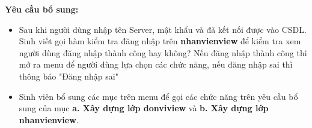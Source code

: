  \textbf{ Yêu cầu bổ sung:}
 \begin{itemize}
 	\item Sau khi người dùng nhập tên Server, mật khẩu và đã kết nối được vào  CSDL. Sinh viết gọi hàm kiểm tra đăng nhập trên \textbf{nhanvienview}  để kiểm tra xem người dùng đăng nhập thành công hay không? Nếu đăng nhập thành công thì mở ra menu để người dùng lựa chọn các chức năng, nếu đăng nhập sai thì thông báo "Đăng nhập sai"
 	\item  Sinh viên bổ sung các mục trên menu để gọi các chức năng trên yêu cầu bổ sung của mục  \textbf{ a. Xây dựng lớp donviview}  và \textbf{b. Xây dựng lớp nhanvienview}.
 \end{itemize}




